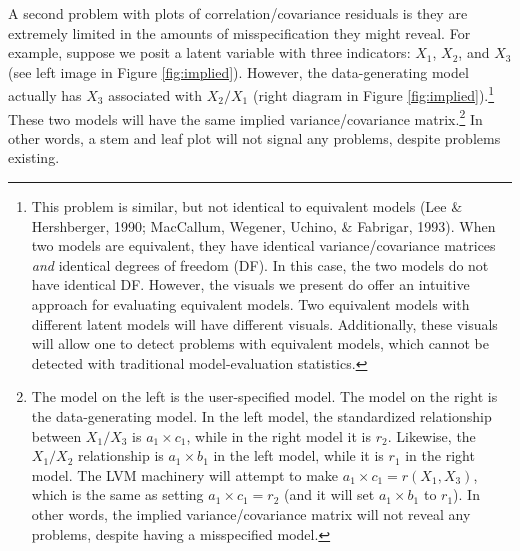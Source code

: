 \documentclass[
  english,
  man]{apa6}
\begin{document}
A second problem with plots of correlation/covariance residuals is they are extremely limited in the amounts of misspecification they might reveal. For example, suppose we posit a latent variable with three indicators: \(X_1\), \(X_2\), and \(X_3\) (see left image in Figure \ref{fig:implied}). However, the data-generating model actually has \(X_3\) associated with \(X_2/X_1\) (right diagram in Figure \ref{fig:implied}).\footnote{This problem is similar, but not identical to equivalent models (Lee \& Hershberger, 1990; MacCallum, Wegener, Uchino, \& Fabrigar, 1993). When two models are equivalent, they have identical variance/covariance matrices \emph{and} identical degrees of freedom (DF). In this case, the two models do not have identical DF. However, the visuals we present do offer an intuitive approach for evaluating equivalent models. Two equivalent models with different latent models will have different visuals. Additionally, these visuals will allow one to detect problems with equivalent models, which cannot be detected with traditional model-evaluation statistics.} These two models will have the same implied variance/covariance matrix.\footnote{The model on the left is the user-specified model. The model on the right is the data-generating model. In the left model, the standardized relationship between \(X_1/X_3\) is \(a_1\times c_1\), while in the right model it is \(r_2\). Likewise, the \(X_1/X_2\) relationship is \(a_1\times b_1\) in the left model, while it is \(r_1\) in the right model. The LVM machinery will attempt to make \(a_1\times c_1 = r(X_1, X_3)\), which is the same as setting \(a_1\times c_1 = r_2\) (and it will set \(a_1\times b_1\) to \(r_1\)). In other words, the implied variance/covariance matrix will not reveal any problems, despite having a misspecified model.} In other words, a stem and leaf plot will not signal any problems, despite problems existing.
\end{document}
